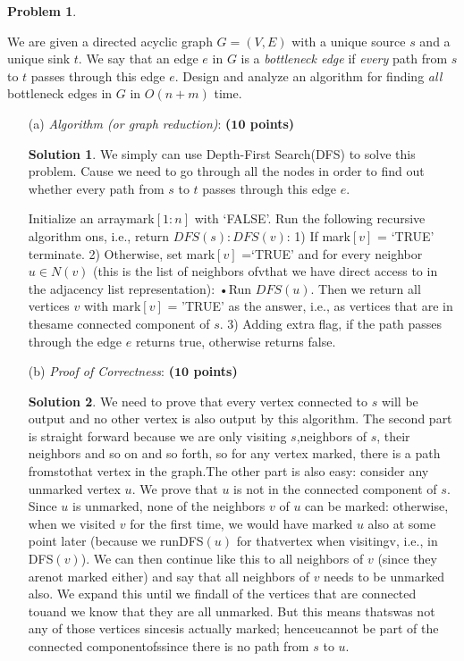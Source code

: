 \documentclass{article}
\theoremstyle{definition}
\newtheorem{problem}{Problem}
\newtheorem*{solution*}{Solution}
\newenvironment{solution}{\begin{solution*}}{{} \end{solution*}}
\newcommand{\grade}[1]{\hfill{\textbf{($\mathbf{#1}$ points)}}}
\begin{document}
\newpage


\begin{problem}\label{search}
	
	We are given a directed acyclic graph $G=(V,E)$ with a unique source $s$ and a unique sink $t$. We say that an edge $e$ in $G$ is a \emph{bottleneck edge} if \emph{every} path from $s$ to $t$ passes through this edge $e$. Design and analyze an algorithm 
	for finding \emph{all} bottleneck edges in $G$ in $O(n+m)$ time. \\

\begin{enumerate}
	\item[(a)] \emph{Algorithm (or graph reduction)}: \grade{10} 
	
	
\begin{solution}
	
	We simply can use Depth-First Search(DFS) to solve this problem. Cause we need to go through all the nodes in order to find out whether every path from $s$ to $t$ passes through this edge $e$. 

	Initialize an arraymark$[1:n]$ with ‘FALSE’. Run the following recursive algorithm ons, i.e., return $DFS(s) : DFS(v)$: 1) If mark$[v]$ = ‘TRUE’ terminate. 2) Otherwise, set mark$[v]$ =‘TRUE’ and for every neighbor $u \in N(v)$ (this is the list of neighbors ofvthat we have direct access to in the adjacency list representation): •Run $DFS(u)$. Then we return all vertices $v$ with mark$[v]$ = 'TRUE' as the answer, i.e., as vertices that are in thesame connected component of $s$. 3) Adding extra flag, if the path passes through the edge $e$ returns true, otherwise returns false. \\

\end{solution}

	\newpage
	\item[(b)] \emph{Proof of Correctness}: \grade{10} 
	
	
\begin{solution}

	We need to prove that every vertex connected to $s$ will be output and no other vertex is also output by this algorithm. The second part is straight forward because we are only visiting $s$,neighbors of $s$, their neighbors and so on and so forth, so for any vertex marked, there is a path fromstothat vertex in the graph.The  other  part  is  also  easy:  consider  any  unmarked  vertex $u$.   We  prove  that $u$ is  not  in  the  connected component of $s$.  Since $u$ is unmarked,  none of the neighbors $v$ of $u$ can be marked: otherwise,  when we visited $v$ for the first time, we would have marked $u$ also at some point later (because we runDFS$(u)$ for thatvertex when visitingv, i.e., in DFS$(v)$).  We can then continue like this to all neighbors of $v$ (since they arenot marked either) and say that all neighbors of $v$ needs to be unmarked also. We expand this until we findall of the vertices that are connected touand we know that they are all unmarked.  But this means thatswas not any of those vertices sincesis actually marked; henceucannot be part of the connected componentofssince there is no path from $s$ to $u$. \\	


\end{solution}
\end{enumerate}
\end{problem}
\end{document}
